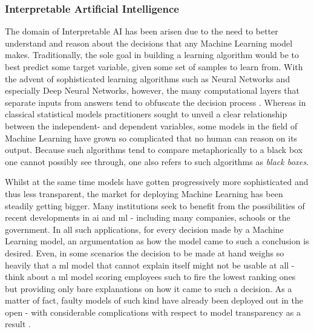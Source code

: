 \documentclass{article}
\begin{document}
\subsubsection{Interpretable Artificial Intelligence}
The domain of Interpretable AI has been arisen due to the need to better understand and reason about the decisions that any Machine Learning model makes. Traditionally, the sole goal in building a learning algorithm would be to best predict some target variable, given some set of samples to learn from. With the advent of sophisticated learning algorithms such as Neural Networks and especially Deep Neural Networks, however, the many computational layers that separate inputs from answers tend to obfuscate the decision process \citep{rai_explainable_2020}. Whereas in classical statistical models practitioners sought to unveil a clear relationship between the independent- and dependent variables, some models in the field of Machine Learning have grown so complicated that no human can reason on its output. Because such algorithms tend to compare metaphorically to a black box one cannot possibly see through, one also refers to such algorithms as \textit{black boxes}.

Whilst at the same time models have gotten progressively more sophisticated and thus less transparent, the market for deploying Machine Learning has been steadily getting bigger. Many institutions seek to benefit from the possibilities of recent developments in \gls{ai} and \gls{ml} - including many companies, schools or the government. In all such applications, for every decision made by a Machine Learning model, an argumentation as how the model came to such a conclusion is desired. Even, in some scenarios the decision to be made at hand weighs so heavily that a \gls{ml} model that cannot explain itself might not be usable at all - think about a \gls{ml} model scoring employees such to fire the lowest ranking ones but providing only bare explanations on how it came to such a decision. As a matter of fact, faulty models of such kind have already been deployed out in the open - with considerable complications with respect to model transparency as a result \citep{oneil_weapons_2016}.
\end{document}
